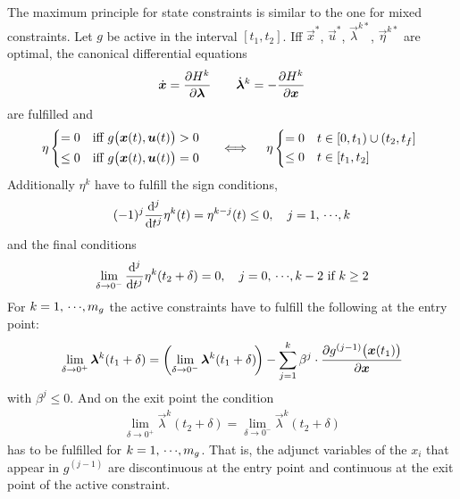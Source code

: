 				The maximum principle for state constraints is similar to the one for mixed constraints. Let \(g\) be active in the interval \( [t_1, t_2] \). Iff \( \vec{x}^\ast \), \( \vec{u}^\ast \), \( \vec{\lambda}^{k\ast} \), \( \vec{\eta}^{k\ast} \) are optimal, the canonical differential equations
				\begin{align*}
					\dot{\bm{x}} = \pdv{H^k}{\bm{\lambda}} \qquad \dot{\bm{\lambda}}^k = -\pdv{H^k}{\bm{x}}
				\end{align*}
				are fulfilled and
				\begin{align*}
					\eta
						\begin{cases*}
							= 0    & iff \( g\big(\vec{x}(t), \vec{u}(t)\big) > 0 \) \\
							\leq 0 & iff \( g\big(\vec{x}(t), \vec{u}(t)\big) = 0 \)
						\end{cases*}
					\quad\iff\quad
					\eta
						\begin{cases*}
							= 0    & \( t \in [0, t_1) \cup (t_2, t_f] \) \\
							\leq 0 & \( t \in [t_1, t_2] \)
						\end{cases*}
				\end{align*}
				Additionally \(\eta^k\) have to fulfill the sign conditions,
				\begin{align*}
					(-1)^j \dv[j]{t} \eta^k(t) = \eta^{k - j}(t) \leq 0,\quad j = 1,\,\cdots\!,k
				\end{align*}
				and the final conditions
				\begin{align*}
					\lim\limits_{\delta \to 0^-} \dv[j]{t} \eta^k(t_2 + \delta) = 0,\quad j = 0,\,\cdots\!,k - 2 \text{ if } k \geq 2
				\end{align*}
				For \( k = 1,\,\cdots\!,m_g \) the active constraints have to fulfill the following at the entry point:
				\begin{align*}
					\lim\limits_{\delta \to 0^+} \bm{\lambda}^k(t_1 + \delta) = \bigg(\! \lim\limits_{\delta \to 0^-} \bm{\lambda}^k(t_1 + \delta) \!\bigg) - \sum_{j = 1}^{k} \beta^j \cdot \pdv{g^{(j - 1)}\big(\bm{x}(t_1)\big)}{\bm{x}}
				\end{align*}
				with \( \beta^j \leq 0 \). And on the exit point the condition
				\begin{align*}
					\lim\limits_{\delta \to 0^+} \vec{\lambda}^k(t_2 + \delta) = \lim\limits_{\delta \to 0^-} \vec{\lambda}^k(t_2 + \delta)
				\end{align*}
				has to be fulfilled for \( k = 1,\,\cdots\!,m_g \). That is, the adjunct variables of the \(x_i\) that appear in \( g^{(j - 1)} \) are discontinuous at the entry point and continuous at the exit point of the active constraint.

